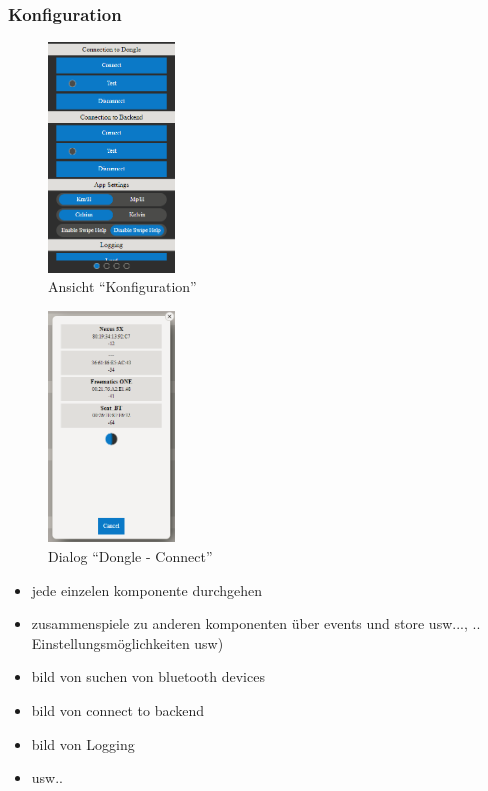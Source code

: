\subsubsection{Konfiguration}
\label{sec:appSichtKonfiguration}

\begin{figure}
  \begin{center}
	\includegraphics[width=0.3\textwidth]{./img/APP_Configuration}
	\caption{Ansicht \enquote{Konfiguration}}
	\label{fig:APP_Configuration}
  \end{center}
\end{figure}

\begin{figure}
  \begin{center}
	\includegraphics[width=0.3\textwidth]{./img/App_Bluetooth_Search}
	\caption{Dialog \enquote{Dongle - Connect}}
	\label{fig:App_Bluetooth_Search}
  \end{center}
\end{figure}


\begin{itemize}
\item jede einzelen komponente durchgehen
\item zusammenspiele zu anderen komponenten über events und store usw..., .. Einstellungsmöglichkeiten usw)
\item bild von suchen von bluetooth devices
\item bild von connect to backend
\item bild von Logging
\item usw..
\end{itemize}


